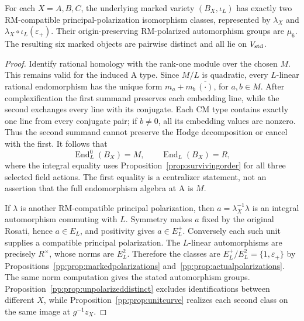 \begin{proposition}
\label{pp:prop:sixprincipal}
For each $X=A,B,C$, the underlying marked variety $(B_X,\iota_L)$ has
exactly two RM-compatible principal-polarization isomorphism classes,
represented by $\lambda_X$ and
$\lambda_X\circ\iota_L(\varepsilon_+)$.
Their origin-preserving RM-polarized automorphism groups are $\mu_6$.
The resulting six marked objects are pairwise distinct and all lie
on $V_{\rm std}$.
\end{proposition}
\begin{proof}
Identify rational homology with the rank-one module over the chosen
$M$. This remains valid for the induced A type. Since $M/L$ is
quadratic, every $L$-linear rational endomorphism has the unique form
$m_a+m_b\,\overline{(\cdot)}$, for $a,b\in M$.
After complexification the first summand preserves each embedding line,
while the second exchanges every line with its conjugate.
Each CM type contains exactly one line from every conjugate pair;
if $b\ne0$, all its embedding values are nonzero. Thus the second
summand cannot preserve the Hodge decomposition or cancel with the
first. It follows that
\[
 \operatorname{End}^0_L(B_X)=M,\qquad
 \operatorname{End}_L(B_X)=R,
\]
where the integral equality uses Proposition~\ref{prop:survivingorder}
for all three selected field actions. The first equality is a
centralizer statement, not an assertion that the full endomorphism
algebra at A is $M$.

If $\lambda$ is another RM-compatible principal polarization, then
$a=\lambda_X^{-1}\lambda$ is an integral automorphism commuting
with $L$. Symmetry makes $a$ fixed by the original Rosati, hence
$a\in E_L$, and positivity gives $a\in E_L^+$.
Conversely each such unit supplies a compatible principal polarization.
The $L$-linear automorphisms are precisely $R^\times$, whose norms
are $E_L^2$. Therefore the classes are
$E_L^+/E_L^2=\{1,\varepsilon_+\}$ by
Propositions~\ref{pp:prop:markedpolarizations}
and~\ref{pp:prop:actualpolarizations}.
The same norm computation gives the stated automorphism groups.
Proposition~\ref{pp:prop:unpolarizeddistinct} excludes identifications
between different $X$, while Proposition~\ref{pp:prop:unitcurve}
realizes each second class on the same image at $g^{-1}z_X$.
\end{proof}

